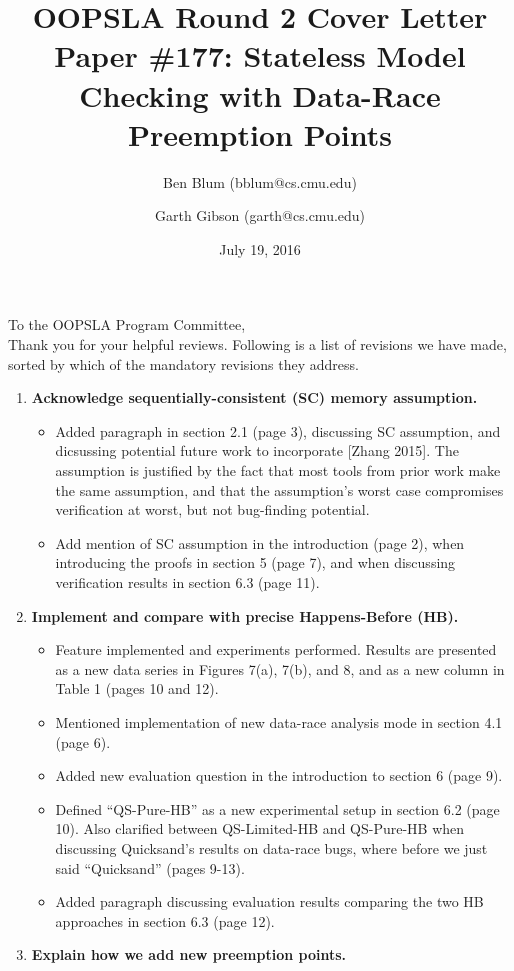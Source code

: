 \documentclass{article}
\title{OOPSLA Round 2 Cover Letter \\ {\large Paper \#177: Stateless Model Checking with Data-Race Preemption Points}}
\author{Ben Blum (\textsf{bblum@cs.cmu.edu}) \and Garth Gibson (\textsf{garth@cs.cmu.edu})}
\date{July 19, 2016}
\begin{document}
\maketitle
\thispagestyle{empty}

\noindent To the OOPSLA Program Committee,
\\

Thank you for your helpful reviews. Following is a list of revisions we have made, sorted by which of the mandatory revisions they address.

\begin{enumerate}
	\item {\bf Acknowledge sequentially-consistent (SC) memory assumption.}
	\begin{itemize}
		\item Added paragraph in section 2.1 (page 3), discussing SC assumption, and dicsussing potential future work to incorporate [Zhang 2015]. The assumption is justified by the fact that most tools from prior work make the same assumption, and that the assumption's worst case compromises verification at worst, but not bug-finding potential.
		\item Add mention of SC assumption in the introduction (page 2),
		when introducing the proofs in section 5 (page 7),
		and when discussing verification results in section 6.3 (page 11).
	\end{itemize}
	\item {\bf Implement and compare with precise Happens-Before (HB).}
	\begin{itemize}
		\item Feature implemented and experiments performed. Results are presented as a new data series in Figures 7(a), 7(b), and 8, and as a new column in Table 1 (pages 10 and 12).
		\item Mentioned implementation of new data-race analysis mode in section 4.1 (page 6).
		\item Added new evaluation question in the introduction to section 6 (page 9).
		\item Defined ``QS-Pure-HB'' as a new experimental setup in section 6.2 (page 10). Also clarified between QS-Limited-HB and QS-Pure-HB when discussing Quicksand's results on data-race bugs, where before we just said ``Quicksand'' (pages 9-13).
		\item Added paragraph discussing evaluation results comparing the two HB approaches in section 6.3 (page 12).
	\end{itemize}
	\item {\bf Explain how we add new preemption points.}

\end{enumerate}
\end{document}
